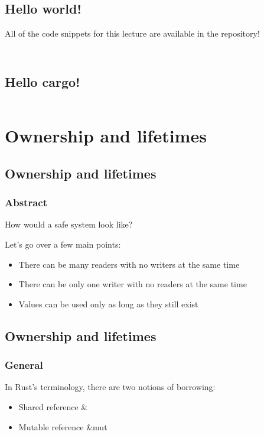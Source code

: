 \documentclass[usenames,twocolumn,dvipsnames,10pt,a4wide]{article}
\begin{document}
\subsection{Hello world!}
	All of the code snippets for this lecture
	are available in the repository!
	
	\inputminted[fontsize=\normalsize]{rust}{code/helloworld.rs}
	
	\inputminted[fontsize=\normalsize]{bash}{code/helloworld.sh}



\subsection{Hello cargo!}
	\inputminted[fontsize=\normalsize]{bash}{code/hellocargo.sh}



\section{Ownership and lifetimes}
\subsection{Ownership and lifetimes}
	\subsubsection{Abstract}
	How would a safe system look like?
	
	Let's go over a few main points:
	
	\begin{itemize}[label=$\bullet$]
		\item There can be many readers with no writers at the same time
		\item There can be only one writer with no readers at the same time
		\item Values can be used only as long as they still exist
	\end{itemize}


\subsection{Ownership and lifetimes}
	\subsubsection{General}
	In Rust's terminology, there are two notions of borrowing:
	\begin{itemize}[label=$\bullet$]
		\item Shared reference \&
		\item Mutable reference \&mut
	\end{itemize}
\end{document}
